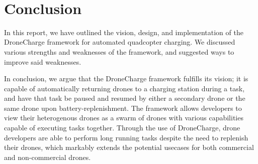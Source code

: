 \\
\section{Conclusion}
In this report, we have outlined the vision, design, and implementation of the DroneCharge framework for automated quadcopter charging. We discussed various strengths and weaknesses of the framework, and suggested ways to improve said weaknesses.

In conclusion, we argue that the DroneCharge framework fulfills its vision; it is capable of automatically returning drones to a charging station during a task, and have that task be paused and resumed by either a secondary drone or the same drone upon battery-replenishment. The framework allows developers to view their heterogenous drones as a swarm of drones with various capabilities capable of executing tasks together. Through the use of DroneCharge, drone developers are able to perform long running tasks despite the need to replenish their drones, which markably extends the potential usecases for both commercial and non-commercial drones.
